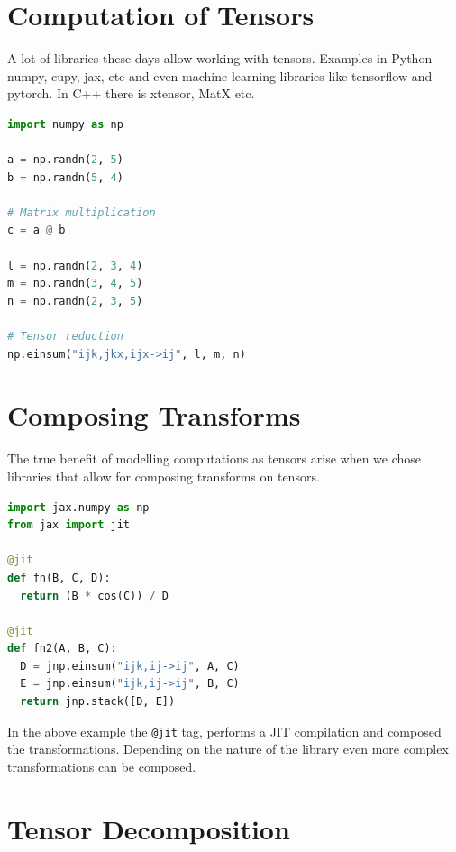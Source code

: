 \documentclass[statementpaper,oneside,article,14pt]{memoir}
\begin{document}
\newpage
\section{Computation of Tensors}

A lot of libraries these days allow working with tensors. Examples in Python numpy, cupy, jax, etc and even machine learning libraries like tensorflow and pytorch. In C++ there is xtensor, MatX etc.

\vfill

\begin{lstlisting}[language=Python]
import numpy as np

a = np.randn(2, 5)
b = np.randn(5, 4)

# Matrix multiplication
c = a @ b

l = np.randn(2, 3, 4)
m = np.randn(3, 4, 5)
n = np.randn(2, 3, 5)

# Tensor reduction
np.einsum("ijk,jkx,ijx->ij", l, m, n)
\end{lstlisting}

\newpage
\section{Composing Transforms}

The true benefit of modelling computations as tensors arise when we chose libraries that allow for composing transforms on tensors.

\vfill

\begin{lstlisting}[language=Python]
import jax.numpy as np
from jax import jit

@jit
def fn(B, C, D):
  return (B * cos(C)) / D

@jit
def fn2(A, B, C):
  D = jnp.einsum("ijk,ij->ij", A, C)
  E = jnp.einsum("ijk,ij->ij", B, C)
  return jnp.stack([D, E])
\end{lstlisting}

\vfill

In the above example the \texttt{@jit} tag, performs a JIT compilation and composed the transformations. Depending on the nature of the library even more complex transformations can be composed.

\newpage
\section{Tensor Decomposition}

\vfill

\begin{center}
\end{center}
\end{document}
